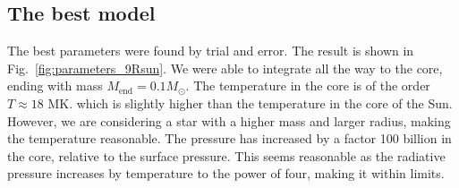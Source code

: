 \documentclass[a4paper, 11pt, english]{article}
\newcommand{\refig}[1]{\textcolor{blue}{\ref{fig:#1}}} %
\begin{document}
\subsection{The best model}
The best parameters were found by trial and error. The result is shown in
Fig.~\refig{parameters_9Rsun}. We were able to integrate all the way to the core, ending
with mass $M_{\mathrm{end}} = 0.1M_{\odot}$. The temperature in the core is of the order $T \approx 18$
MK. which is slightly higher than the temperature in the core of the Sun. However, we 
are considering a star with a higher mass and larger radius, making the temperature
reasonable. The pressure has increased by a factor 100 billion in the core, relative to
the surface pressure. This seems
reasonable as the radiative pressure increases by temperature to the power of four, making
it within limits.
\end{document}
